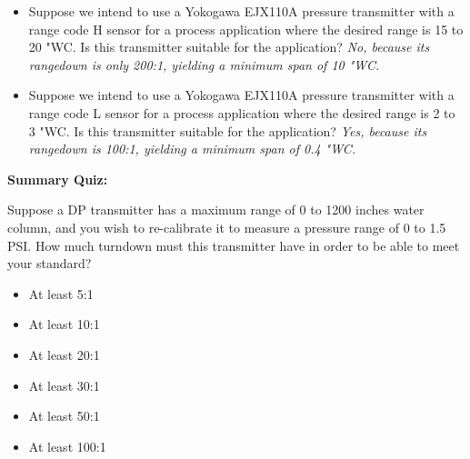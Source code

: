\begin{itemize}
\vskip 5pt
\item{} Suppose we intend to use a Yokogawa EJX110A pressure transmitter with a range code H sensor for a process application where the desired range is 15 to 20 "WC.  Is this transmitter suitable for the application?  {\it No, because its rangedown is only 200:1, yielding a minimum span of 10 "WC.}
\vskip 5pt
\item{} Suppose we intend to use a Yokogawa EJX110A pressure transmitter with a range code L sensor for a process application where the desired range is 2 to 3 "WC.  Is this transmitter suitable for the application?  {\it Yes, because its rangedown is 100:1, yielding a minimum span of 0.4 "WC.}
\end{itemize}















\vfil \eject

\noindent
{\bf Summary Quiz:}

Suppose a DP transmitter has a maximum range of 0 to 1200 inches water column, and you wish to re-calibrate it to measure a pressure range of 0 to 1.5 PSI.  How much turndown must this transmitter have in order to be able to meet your standard?

\begin{itemize}
\item{} At least 5:1
\vskip 5pt 
\item{} At least 10:1
\vskip 5pt 
\item{} At least 20:1
\vskip 5pt 
\item{} At least 30:1
\vskip 5pt 
\item{} At least 50:1
\vskip 5pt 
\item{} At least 100:1
\end{itemize}




